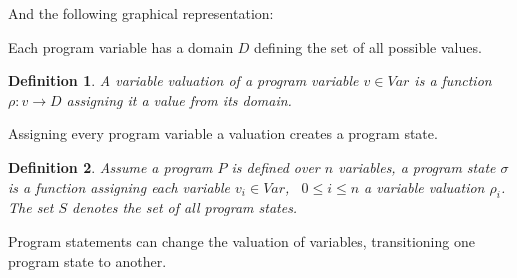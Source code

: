 \documentclass{article}
\newcommand{\tikzstmt}[3]{{%
\tikz[baseline]{%
	\node[st,fill=#2] at (0,.64ex){%
	\hspace{.3em}\texttt{\strut#3#1}\hspace{.3em}\strut};}
}}
\newcommand{\stfootcol}[2]{\tikzstmt{#1}{#2}{\footnotesize}}
\newcommand{\stfoot}[1]{\stfootcol{#1}{stmtcolor}}
\newcommand{\st}[1]{\stfoot{#1}}
\newcommand{\Var}{\ensuremath{\mathit{Var}}\xspace}
\newcounter{example}[section]
\newtheorem{mydef}{Definition}
\newcommand\mycom[1]{}
\newcommand\mycom[1]{#1}
\newcommand{\dd}[1]{\mycom{\todo[color=orange!40,inline]{\small DD: #1}}}
\newcommand{\ts}[1]{\mycom{\todo[color=green!40,inline]{\small TS: #1}}}
\begin{document}
\begin{example}
And the following graphical representation: 
\begin{figure}[H]
    \centering
    \label{fig:ex:p0:cfg}
\end{figure}
\end{example}

Each program variable has a domain $D$ defining the set of all possible values.
\begin{mydef}
    A variable valuation of a program variable $v \in \Var$ is a function $\rho: v \rightarrow D$  assigning it a value from its domain.
\end{mydef}
Assigning every program variable a valuation creates a program state.


\begin{mydef}
    Assume a program $P$ is defined over $n$ variables, a program state $\sigma$ is a function assigning each variable $v_i \in \Var$, \ $0 \leq i \leq n$ a variable valuation $\rho_i$. The set $S$ denotes the set of all program states.
\end{mydef}

Program statements can change the valuation of variables, transitioning one program state to another.
\end{document}
